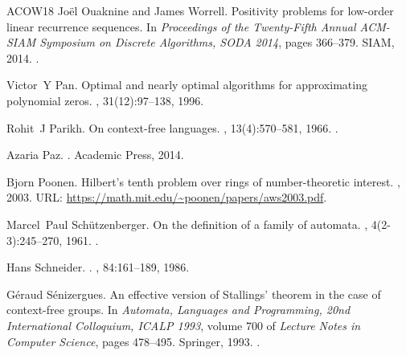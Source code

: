 \documentclass[10pt,a4paper]{amsart}
\numberwithin{equation}{section}
\theoremstyle{plain}
\theoremstyle{definition}
\theoremstyle{remark}
\begin{document}
\begin{thebibliography}{ACOW18}
Jo{\"{e}}l Ouaknine and James Worrell.
\newblock Positivity problems for low-order linear recurrence sequences.
\newblock In {\em Proceedings of the Twenty-Fifth Annual {ACM-SIAM} Symposium
  on Discrete Algorithms, {SODA} 2014}, pages 366--379. {SIAM}, 2014.
\newblock \href {https://doi.org/10.1137/1.9781611973402.27}
  {}.

Victor~Y Pan.
\newblock Optimal and nearly optimal algorithms for approximating polynomial
  zeros.
, 31(12):97--138,
  1996.

Rohit~J Parikh.
\newblock On context-free languages.
, 13(4):570--581, 1966.
\newblock \href {https://doi.org/10.1145/321356.321364}
  {}.

Azaria Paz.
.
\newblock Academic Press, 2014.

Bjorn Poonen.
\newblock Hilbert's tenth problem over rings of number-theoretic interest.
, 2003.
\newblock URL: \url{https://math.mit.edu/~poonen/papers/aws2003.pdf}.

Marcel~Paul Sch{\"{u}}tzenberger.
\newblock On the definition of a family of automata.
, 4(2-3):245--270, 1961.
\newblock \href {https://doi.org/10.1016/S0019-9958(61)80020-X}
  {}.

Hans Schneider.
.
, 84:161--189, 1986.

G{\'{e}}raud S{\'{e}}nizergues.
\newblock An effective version of {Stallings'} theorem in the case of
  context-free groups.
\newblock In {\em Automata, Languages and Programming, 20nd International
  Colloquium, {ICALP 1993}}, volume 700 of {\em Lecture Notes in Computer
  Science}, pages 478--495. Springer, 1993.
\newblock \href {https://doi.org/10.1007/3-540-56939-1_96}
  {}.


\end{thebibliography}
\end{document}
